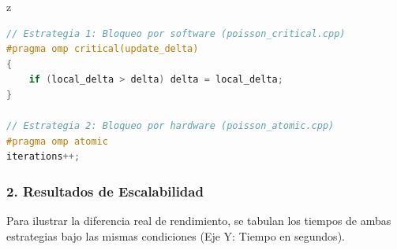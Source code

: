 z\documentclass[11pt,a4paper]{article}
\begin{document}
\begin{lstlisting}[language=C++, caption={Comparativa de implementación: critical vs atomic.}, label={lst:act6}]
// Estrategia 1: Bloqueo por software (poisson_critical.cpp)
#pragma omp critical(update_delta)
{
    if (local_delta > delta) delta = local_delta;
}

// Estrategia 2: Bloqueo por hardware (poisson_atomic.cpp)
#pragma omp atomic
iterations++; 
\end{lstlisting}

\subsubsection*{2. Resultados de Escalabilidad}
Para ilustrar la diferencia real de rendimiento, se tabulan los tiempos de ambas estrategias bajo las mismas condiciones (Eje Y: Tiempo en segundos).
\end{document}

